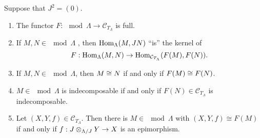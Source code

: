 %




\begin{lemma}\label{3.5.2}
 Suppose that $J^2 = (0)$.
 \begin{enumerate}
 \item The functor $F : \mod \Lambda \to \mathcal{C}_{T_\Lambda}$ is full.
 \item If $M, N \in \mod \Lambda$ , then $\operatorname{Hom}_\Lambda(M, J N)$ “is” the kernel of \[F:
 \operatorname{Hom}_\Lambda(M,N) \to \operatorname{Hom}_{\mathcal{C}_{T_\Lambda}}(F(M), F(N)).\]
 \item If $M,N \in \mod \Lambda$, then $M \cong N$ if and only if $F(M) \cong F(N)$.
 \item $M \in \mod \Lambda$ is indecomposable if and only if $F(N) \in \mathcal{C}_{T_\Lambda}$ is indecomposable.
 \item Let $(X, Y, f) \in \mathcal{C}_{T_\Lambda}$. Then there is $M \in \mod \Lambda$ with $(X, Y, f)
 \cong F(M)$ if and only if $f: J \otimes_{\Lambda/J} Y \to X$ is an epimorphism.
 \end{enumerate}
\end{lemma}


